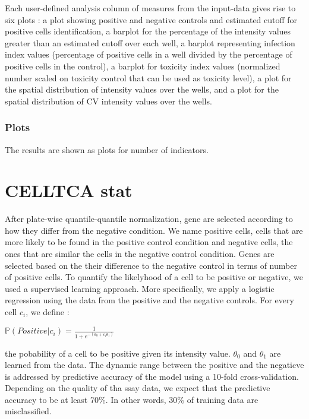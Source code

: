 \documentclass[a4paper,10pt]{article}
\begin{document}
Each user-defined analysis column of measures from the input-data gives rise to six plots : a plot showing
positive and negative controls and estimated cutoff for positive cells identification, a barplot 
for the percentage of the intensity values greater than an estimated cutoff over each well, a barplot 
representing infection index values (percentage of positive cells in a well divided by the percentage
of positive cells in the control), a barplot for toxicity index values (normalized number scaled on 
toxicity control that can be used as toxicity level), a plot for the spatial distribution of intensity 
values over the wells, and a plot for the spatial distribution of CV intensity values over the wells.


\subsubsection*{Plots}


The results are shown as plots for number of indicators.

\newpage

\section*{CELLTCA stat}
After plate-wise quantile-quantile normalization, gene are selected according to how they differ from
the negative condition. We name positive cells, cells that are more likely to be found in the positive 
control condition and negative cells, the ones that are similar the cells in the negative control
condition. Genes are selected based on the their difference to the negative control in terms of
number of positive cells. To quantify the likelyhood of a cell to be positive or negative, we 
used a supervised learning approach. More specifically, we apply a logistic regression using 
the data from the positive and the negative controls. For every cell $c_{i}$, we define :
\begin{center}
  $\mathbb{P}(Positive | c_{i}) = \frac{1}{1+e^{-(\theta_{0}+c_{i}\theta_{1})}}$
\end{center}  
the pobability of a cell to be positive given its intensity value. $\theta_{0}$ and $\theta_{1}$ are 
learned from the data. The dynamic range between the positive and
the negaticve is addressed by predictive accuracy of the model using a 10-fold cross-validation. 
Depending on the quality of tha ssay data, we expect that the predictive accuracy to be at least 70\%.
In other words, 30\% of training data are misclassified.
 
\end{document}
